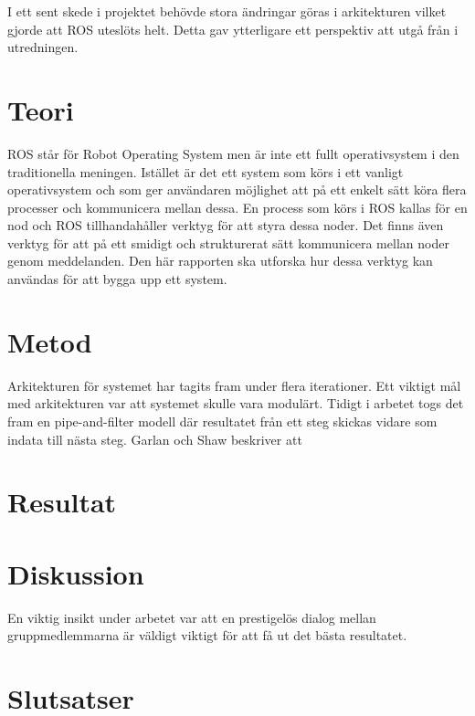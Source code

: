 I ett sent skede i projektet behövde stora ändringar göras i arkitekturen vilket gjorde att ROS uteslöts helt. Detta gav ytterligare ett perspektiv att utgå från i utredningen.

\section{Teori}
\label{sec:theory-lundberg}

ROS står för Robot Operating System men är inte ett fullt operativsystem i den traditionella meningen. Istället är det ett system som körs i ett vanligt operativsystem och som ger användaren möjlighet att på ett enkelt sätt köra flera processer och kommunicera mellan dessa. En process som körs i ROS kallas för en nod och ROS tillhandahåller verktyg för att styra dessa noder. Det finns även verktyg för att på ett smidigt och strukturerat sätt kommunicera mellan noder genom meddelanden. Den här rapporten ska utforska hur dessa verktyg kan användas för att bygga upp ett system.

\cite{quigley2009ros}

\section{Metod}
\label{sec:method-lundberg}

Arkitekturen för systemet har tagits fram under flera iterationer. Ett viktigt mål med arkitekturen var att systemet skulle vara modulärt. Tidigt i arbetet togs det fram en pipe-and-filter modell där resultatet från ett steg skickas vidare som indata till nästa steg. Garlan och Shaw \cite{garlan1993introduction} beskriver att 



\section{Resultat}
\label{sec:results-lundberg}


\section{Diskussion}
\label{sec:discussion-lundberg}

En viktig insikt under arbetet var att en prestigelös dialog mellan gruppmedlemmarna är väldigt viktigt för att få ut det bästa resultatet.

\section{Slutsatser}
\label{sec:conclusions-lundberg}


